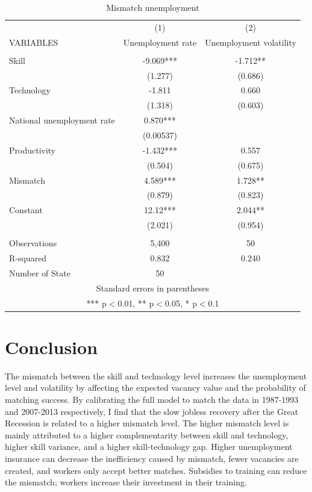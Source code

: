 \documentclass[12pt]{article}
\newcommand{\1}{\mathbb{1}}
\begin{document}
\begin{table}[h!]
\scriptsize
\begin{center}
\begin{tabular}{lcc} \hline \hline
 & (1) & (2) \\
VARIABLES & Unemployment rate & Unemployment volatility \\ \hline
 &  &  \\
Skill & -9.069*** & -1.712** \\
 & (1.277) & (0.686) \\
Technology & -1.811 & 0.660 \\
 & (1.318) & (0.603) \\
National unemployment rate & 0.870*** &  \\
 & (0.00537) &  \\
Productivity & -1.432*** & 0.557 \\
 & (0.504) & (0.675) \\
Mismatch & 4.589*** & 1.728** \\
 & (0.879) & (0.823) \\
Constant & 12.12*** & 2.044** \\
 & (2.021) & (0.954) \\
 &  &  \\
Observations & 5,400 & 50 \\
R-squared & 0.832 & 0.240 \\
 Number of State & 50 &  \\ \hline
\multicolumn{3}{c}{ Standard errors in parentheses} \\
\multicolumn{3}{c}{ *** p$<$0.01, ** p$<$0.05, * p$<$0.1} \\
\end{tabular}
\end{center}
\caption{Mismatch unemployment}
\label{unemployment}
\end{table}

\section{Conclusion}
The mismatch between the skill and technology level increases the unemployment level and volatility by affecting the expected vacancy value and the probability of matching success. By calibrating the full model to match the data in 1987-1993 and 2007-2013 respectively, I find that the slow jobless recovery after the Great Recession is related to a higher mismatch level. The higher mismatch level is mainly attributed to a higher complementarity between skill and technology, higher skill variance, and a higher skill-technology gap. Higher unemployment insurance can decrease the inefficiency caused by mismatch, fewer vacancies are created, and workers only accept better matches. Subsidies to training can reduce the mismatch; workers increase their investment in their training. 

\clearpage


\end{document}
